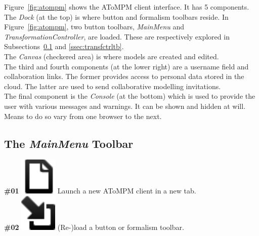 \documentclass{article}
\numberwithin{equation}{section}
\numberwithin{figure}{section}
\begin{document}
Figure~\ref{fig:atompm} shows the AToMPM client interface. It has 5 components.\\

The \textit{Dock} (at the top) is where button and formalism toolbars reside. In Figure~\ref{fig:atompm}, two button toolbars, \textit{MainMenu} and \textit{TransformationController}, are loaded. These are respectively explored in Subsections~\ref{ssec:mainmenutb} and \ref{ssec:transfctrltb}.\\

The \textit{Canvas} (checkered area) is where models are created and edited.\\

The third and fourth components (at the lower right) are a username field and collaboration links. The former provides access to personal data stored in the cloud. The latter are used to send collaborative modelling invitations.\\

The final component is the \textit{Console} (at the bottom) which is used to provide the user with various messages and warnings. It can be shown and hidden at will. Means to do so vary from one browser to the next.



\subsection{The \textit{MainMenu} Toolbar} 
\label{ssec:mainmenutb}

\textbf{\#01} \hspace*{1cm}
\includegraphics[scale=0.5]{figures/icon_newTab} \hspace*{1cm}
Launch a new AToMPM client in a new tab.\\

\textbf{\#02} \hspace*{1cm}
\includegraphics[scale=0.5]{figures/icon_loadToolbar} \hspace*{1cm}
(Re-)load a button or formalism toolbar.\\
\end{document}
